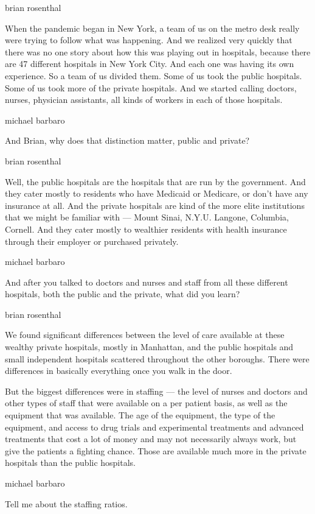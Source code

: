 brian rosenthal

When the pandemic began in New York, a team of us on the metro desk
really were trying to follow what was happening. And we realized very
quickly that there was no one story about how this was playing out in
hospitals, because there are 47 different hospitals in New York City.
And each one was having its own experience. So a team of us divided
them. Some of us took the public hospitals. Some of us took more of the
private hospitals. And we started calling doctors, nurses, physician
assistants, all kinds of workers in each of those hospitals.

michael barbaro

And Brian, why does that distinction matter, public and private?

brian rosenthal

Well, the public hospitals are the hospitals that are run by the
government. And they cater mostly to residents who have Medicaid or
Medicare, or don't have any insurance at all. And the private hospitals
are kind of the more elite institutions that we might be familiar with
--- Mount Sinai, N.Y.U. Langone, Columbia, Cornell. And they cater
mostly to wealthier residents with health insurance through their
employer or purchased privately.

michael barbaro

And after you talked to doctors and nurses and staff from all these
different hospitals, both the public and the private, what did you
learn?

brian rosenthal

We found significant differences between the level of care available at
these wealthy private hospitals, mostly in Manhattan, and the public
hospitals and small independent hospitals scattered throughout the other
boroughs. There were differences in basically everything once you walk
in the door.

But the biggest differences were in staffing --- the level of nurses and
doctors and other types of staff that were available on a per patient
basis, as well as the equipment that was available. The age of the
equipment, the type of the equipment, and access to drug trials and
experimental treatments and advanced treatments that cost a lot of money
and may not necessarily always work, but give the patients a fighting
chance. Those are available much more in the private hospitals than the
public hospitals.

michael barbaro

Tell me about the staffing ratios.

